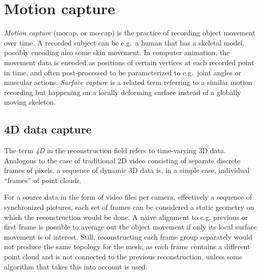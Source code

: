 \clearpage
\section{Motion capture} \label{sec:motioncapture} %

\emph{Motion capture} (mocap, or mo-cap) is the practice of recording object movement over time.
A recorded subject can be e.g.\ a human that has a skeletal model, possibly encoding also some skin movement.
In computer animation, the movement data is encoded as positions of certain vertices at each recorded point in time, and often post-processed to be parameterized to e.g.\ joint angles or muscular actions. \cite{deng2007computer,waters1987muscle}
\emph{Surface capture} is a related term referring to a similar motion recording but happening on a locally deforming surface instead of a globally moving skeleton.



\subsection{4D data capture} %

The term \emph{4D} in the reconstruction field refers to time-varying 3D data.
Analogous to the case of traditional 2D video consisting of separate discrete frames of pixels, a sequence of dynamic 3D data is, in a simple case, individual ``frames'' of point clouds.

For a source data in the form of video files per camera, effectively a sequence of synchronized pictures, each set of frames can be considered a static geometry on which the reconstruction would be done.
A naive alignment to e.g. previous or first frame is possible to average out the object movement if only its local surface movement is of interest.
Still, reconstructing each frame group separately would not produce the same topology for the mesh, as each frame contains a different point cloud and is not connected to the previous reconstruction, unless some algorithm that takes this into account is used.

